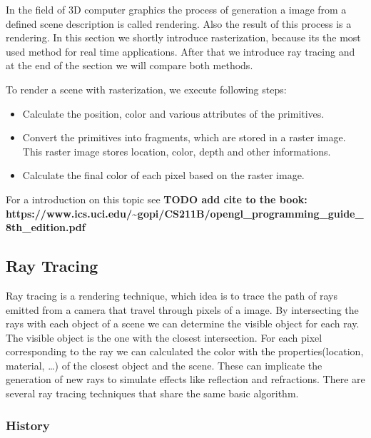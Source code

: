 In the field of 3D computer graphics the process of generation a image
from a defined scene description is called rendering. Also the result of
this process is a rendering. In this section we shortly introduce
rasterization, because its the most used method for real time
applications. After that we introduce ray tracing and at the end of the
section we will compare both methods.


To render a scene with rasterization, we execute following steps:

\begin{itemize}
\itemsep1pt\parskip0pt
\item
  Calculate the position, color and various attributes of the
  primitives.
\item
  Convert the primitives into fragments, which are stored in a raster
  image. This raster image stores location, color, depth and other
  informations.
\item
  Calculate the final color of each pixel based on the raster image.
\end{itemize}

For a introduction on this topic see \textbf{TODO add cite to the book:
https://www.ics.uci.edu/\textasciitilde{}gopi/CS211B/opengl\_programming\_guide\_8th\_edition.pdf}

\subsection{Ray Tracing}\label{ray-tracing}

Ray tracing is a rendering technique, which idea is to trace the path of
rays emitted from a camera that travel through pixels of a image. By
intersecting the rays with each object of a scene we can determine the
visible object for each ray. The visible object is the one with the
closest intersection. For each pixel corresponding to the ray we can
calculated the color with the properties(location, material, \ldots{})
of the closest object and the scene. These can implicate the generation
of new rays to simulate effects like reflection and refractions. There
are several ray tracing techniques that share the same basic algorithm.

\subsubsection{History}\label{history}

